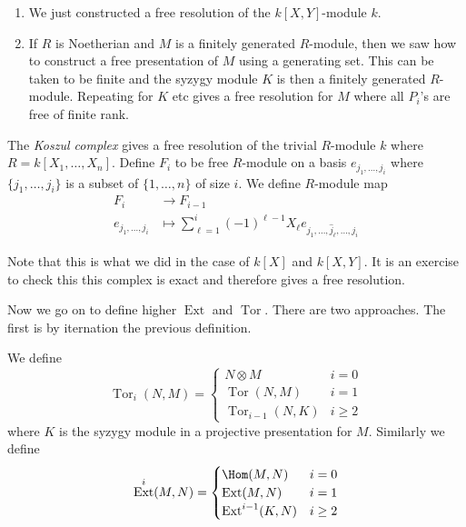 \documentclass[a4paper]{article}
\DeclareMathOperator{\Tor}{Tor}
\DeclareMathOperator{\Ext}{Ext}
\begin{document}
\begin{remark}\leavevmode
  \begin{enumerate}
  \item We just constructed a free resolution of the \(k[X, Y]\)-module \(k\).
  \item If \(R\) is Noetherian and \(M\) is a finitely generated \(R\)-module, then we saw how to construct a free presentation of \(M\) using a generating set. This can be taken to be finite and the syzygy module \(K\) is then a finitely generated \(R\)-module. Repeating for \(K\) etc gives a free resolution for \(M\) where all \(P_i\)'s are free of finite rank.
  \end{enumerate}
\end{remark}

\begin{definition}
  The \emph{Koszul complex} gives a free resolution of the trivial \(R\)-module \(k\) where \(R = k[X_1, \dots, X_n]\). Define \(F_i\) to be free \(R\)-module on a basis \(e_{j_1, \dots, j_i}\) where \(\{j_1, \dots, j_i\}\) is a subset of \(\{1, \dots, n\}\) of size \(i\). We define \(R\)-module map
  \begin{align*}
    F_i &\to F_{i - 1} \\
    e_{j_1, \dots, j_i} &\mapsto \sum_{\ell = 1}^i (-1)^{\ell - 1} X_\ell e_{j_1, \dots, \hat j_{\ell}, \dots, j_i}
  \end{align*}
\end{definition}

Note that this is what we did in the case of \(k[X]\) and \(k[X, Y]\). It is an exercise to check this this complex is exact and therefore gives a free resolution.

Now we go on to define higher \(\Ext\) and \(\Tor\). There are two approaches. The first is by iternation the previous definition.

\begin{definition}
  We define
  \[
    \Tor_i(N, M) =
    \begin{cases}
      N \otimes M & i = 0 \\
      \Tor(N, M) & i = 1 \\
      \Tor_{i - 1}(N, K) & i \geq 2
    \end{cases}
  \]
  where \(K\) is the syzygy module in a projective presentation for \(M\). Similarly we define
  \[
    \Ext^i(M, N) =
    \begin{cases}
      \Hom(M, N) & i = 0 \\
      \Ext(M, N) & i = 1 \\
      \Ext^{i - 1}(K, N) & i \geq 2
    \end{cases}
  \]
\end{definition}
\end{document}
